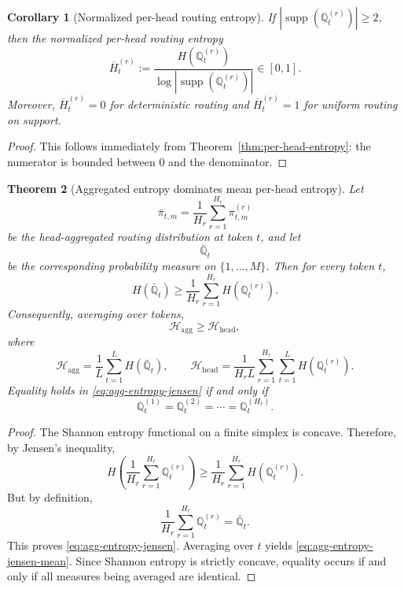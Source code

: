 \documentclass{article}
\theoremstyle{plain}
\newtheorem{theorem}{Theorem}[section]
\newtheorem{corollary}[theorem]{Corollary}
\theoremstyle{definition}
\theoremstyle{remark}
\begin{document}
\begin{corollary}[Normalized per-head routing entropy]
\label{cor:normalized-head-entropy}
If $\left|\operatorname{supp}\!\left(\mathbb{Q}^{(r)}_{t}\right)\right|\ge 2$, then the normalized per-head routing entropy
\begin{equation}
\label{eq:normalized-head-entropy}
\overline H^{(r)}_{t}
:=
\frac{H\!\left(\mathbb{Q}^{(r)}_{t}\right)}
{\log \left|\operatorname{supp}\!\left(\mathbb{Q}^{(r)}_{t}\right)\right|}
\in [0,1].
\end{equation}
Moreover, $\overline H^{(r)}_{t}=0$ for deterministic routing and $\overline H^{(r)}_{t}=1$ for uniform routing on support.
\end{corollary}

\begin{proof}
This follows immediately from Theorem~\ref{thm:per-head-entropy}: the numerator is bounded between $0$ and the denominator.
\end{proof}

\begin{theorem}[Aggregated entropy dominates mean per-head entropy]
\label{thm:aggregated-vs-head-entropy}
Let
\[
\bar{\pi}_{t,m}
=
\frac{1}{H_r}\sum_{r=1}^{H_r} \pi^{(r)}_{t,m}
\]
be the head-aggregated routing distribution at token $t$, and let
\[
\bar{\mathbb{Q}}_{t}
\]
be the corresponding probability measure on $\{1,\dots,M\}$. Then for every token $t$,
\begin{equation}
\label{eq:agg-entropy-jensen}
H(\bar{\mathbb{Q}}_{t})
\ge
\frac{1}{H_r}\sum_{r=1}^{H_r}
H\!\left(\mathbb{Q}^{(r)}_{t}\right).
\end{equation}
Consequently, averaging over tokens,
\begin{equation}
\label{eq:agg-entropy-jensen-mean}
\mathcal{H}_{\mathrm{agg}}
\ge
\mathcal{H}_{\mathrm{head}},
\end{equation}
where
\[
\mathcal{H}_{\mathrm{agg}}
=
\frac{1}{L}\sum_{t=1}^{L} H(\bar{\mathbb{Q}}_{t}),
\qquad
\mathcal{H}_{\mathrm{head}}
=
\frac{1}{H_r L}\sum_{r=1}^{H_r}\sum_{t=1}^{L} H\!\left(\mathbb{Q}^{(r)}_{t}\right).
\]
Equality holds in \eqref{eq:agg-entropy-jensen} if and only if
\[
\mathbb{Q}^{(1)}_{t}
=
\mathbb{Q}^{(2)}_{t}
=
\cdots
=
\mathbb{Q}^{(H_r)}_{t}.
\]
\end{theorem}

\begin{proof}
The Shannon entropy functional on a finite simplex is concave. Therefore, by Jensen's inequality,
\[
H\!\left(\frac{1}{H_r}\sum_{r=1}^{H_r}\mathbb{Q}^{(r)}_{t}\right)
\ge
\frac{1}{H_r}\sum_{r=1}^{H_r} H\!\left(\mathbb{Q}^{(r)}_{t}\right).
\]
But by definition,
\[
\frac{1}{H_r}\sum_{r=1}^{H_r}\mathbb{Q}^{(r)}_{t}
=
\bar{\mathbb{Q}}_{t}.
\]
This proves \eqref{eq:agg-entropy-jensen}. Averaging over $t$ yields \eqref{eq:agg-entropy-jensen-mean}. Since Shannon entropy is strictly concave, equality occurs if and only if all measures being averaged are identical.
\end{proof}
\end{document}
